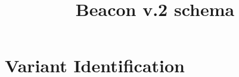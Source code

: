 \documentclass[a4paper, 10pt]{article}        %
\begin{document}
\title{Beacon v.2 schema}
\date{} %
\maketitle




\section*{{\color{teal}Variant Identification}}

\end{document}

